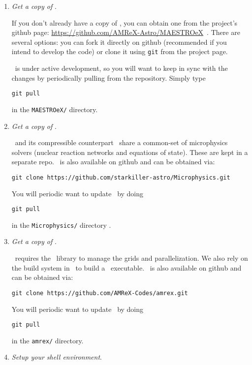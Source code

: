 \begin{enumerate}

\item {\em Get a copy of \maestroex}.

  If you don't already have a copy of \maestroex, you can obtain one
  from the project's {\sf github} page:
  \url{https://github.com/AMReX-Astro/MAESTROeX}\, .  There are several
  options: you can fork it directly on {\sf github} (recommended if
  you intend to develop the code) or clone it using {\tt git} from the
  project page.

  \maestroex\ is under active development, so you will want to keep in
  sync with the changes by periodically pulling from the repository.
  Simply type
  \begin{verbatim}
git pull
  \end{verbatim}
  in the {\tt MAESTROeX/} directory.

\item {\em Get a copy of \microphysics}.

  \maestroex\ and its compressible counterpart \castro\ share a
  common-set of microphysics solvers (nuclear reaction networks and
  equations of state).  These are kept in a separate repo.
  \microphysics\ is also available on github and can be obtained 
  via:
  \begin{verbatim}
git clone https://github.com/starkiller-astro/Microphysics.git
  \end{verbatim}

  You will periodic want to update \microphysics\ by doing
  \begin{verbatim}
git pull
  \end{verbatim}
  in the {\tt Microphysics/} directory
.
\item {\em Get a copy of \amrex}.

  \maestroex\ requires the \amrex\ library to manage the grids and
  parallelization.  We also rely on the build system in \amrex\ to
  build a \maestroex\ executable.  \amrex\ is also available on github
  and can be obtained via:
  \begin{verbatim}
git clone https://github.com/AMReX-Codes/amrex.git
  \end{verbatim}

  You will periodic want to update \amrex\ by doing
  \begin{verbatim}
git pull
  \end{verbatim}
  in the {\tt amrex/} directory.


\item {\em Setup your shell environment}.


\end{enumerate}
